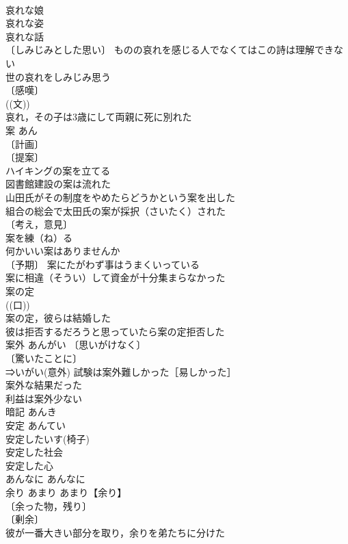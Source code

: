 \documentclass[8pt]{extreport}
\begin{document}
\begin{CJK}{UTF8}{min}
\\	哀れな娘 
\\	哀れな姿 
\\	哀れな話 
\\	〔しみじみとした思い〕 ものの哀れを感じる人でなくてはこの詩は理解できない 
\\	世の哀れをしみじみ思う 
\\	〔感嘆〕
\\	((文)) 
\\	哀れ，その子は3歳にして両親に死に別れた 
\\	案	あん	
\\	〔計画〕
\\	〔提案〕
\\	ハイキングの案を立てる 
\\	図書館建設の案は流れた 
\\	山田氏がその制度をやめたらどうかという案を出した 
\\	組合の総会で太田氏の案が採択（さいたく）された 
\\	〔考え，意見〕
\\	案を練（ね）る 
\\	何かいい案はありませんか 
\\	〔予期〕 案にたがわず事はうまくいっている 
\\	案に相違（そうい）して資金が十分集まらなかった 
\\	案の定 
\\	((口)) 
\\	案の定，彼らは結婚した 
\\	彼は拒否するだろうと思っていたら案の定拒否した 
\\	案外	あんがい	〔思いがけなく〕
\\	〔驚いたことに〕
\\	⇒いがい(意外) 試験は案外難しかった［易しかった］ 
\\	案外な結果だった 
\\	利益は案外少ない 
\\	暗記	あんき	
\\	安定	あんてい	
\\	安定したいす(椅子) 
\\	安定した社会 
\\	安定した心 
\\	あんなに	あんなに	
\\	余り	あまり	あまり【余り】 
\\	〔余った物，残り〕
\\	〔剰余〕
\\	彼が一番大きい部分を取り，余りを弟たちに分けた 

\end{CJK}
\end{document}
